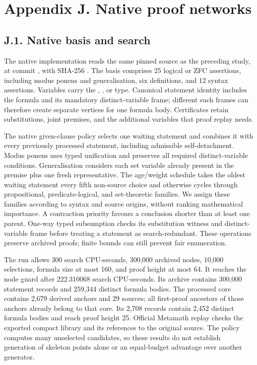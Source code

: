 \documentclass[pdflatex,sn-basic,Numbered]{sn-jnl}
\begin{document}
\section*{Appendix J. Native proof networks}\label{appendix-j.-native-proof-networks}

\subsection*{J.1. Native basis and search}\label{j.1.-native-basis-and-search}

The native implementation reads the same pinned  source as the preceding study, at commit , with SHA-256 . The basis comprises 25 logical or ZFC assertions, including modus ponens and generalisation, six definitions, and 12 syntax assertions. Variables carry the , , or  type. Canonical statement identity includes the formula and its mandatory distinct-variable frame; different such frames can therefore create separate vertices for one formula body. Certificates retain substitutions, joint premises, and the additional variables that proof replay needs.

The native given-clause policy selects one waiting statement and combines it with every previously processed statement, including admissible self-detachment. Modus ponens uses typed unification and preserves all required distinct-variable conditions. Generalisation considers each set variable already present in the premise plus one fresh representative. The age/weight schedule takes the oldest waiting statement every fifth non-source choice and otherwise cycles through propositional, predicate-logical, and set-theoretic families. We assign these families according to syntax and source origins, without ranking mathematical importance. A contraction priority favours a conclusion shorter than at least one parent. One-way typed subsumption checks its substitution witness and distinct-variable frame before treating a statement as search-redundant. These operations preserve archived proofs; finite bounds can still prevent fair enumeration.

The run allows 300 search CPU-seconds, 300,000 archived nodes, 10,000 selections, formula size at most 160, and proof height at most 64. It reaches the node guard after 222.310068 search CPU-seconds. Its archive contains 300,000 statement records and 259,344 distinct formula bodies. The processed core contains 2,679 derived anchors and 29 sources; all first-proof ancestors of those anchors already belong to that core. Its 2,708 records contain 2,452 distinct formula bodies and reach proof height 25. Official Metamath replay checks the exported compact library and its references to the original source. The policy computes many unselected candidates, so these results do not establish generation of skeleton points alone or an equal-budget advantage over another generator.
\end{document}
